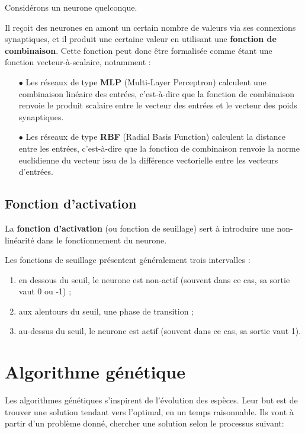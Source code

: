 Considérons un neurone quelconque.

Il reçoit des neurones en amont un certain nombre de valeurs via ses connexions synaptiques, et il produit une certaine valeur en utilisant une \textbf{fonction de combinaison}. Cette fonction peut donc être formalisée comme étant une fonction vecteur-à-scalaire, notamment :

\begin{itemize}
    \item[$\bullet$] Les réseaux de type \textbf{MLP} (Multi-Layer Perceptron) calculent une combinaison linéaire des entrées, c’est-à-dire que la fonction de combinaison renvoie le produit scalaire entre le vecteur des entrées et le vecteur des poids synaptiques.
    \item[$\bullet$] Les réseaux de type \textbf{RBF} (Radial Basis Function) calculent la distance entre les entrées, c’est-à-dire que la fonction de combinaison renvoie la norme euclidienne du vecteur issu de la différence vectorielle entre les vecteurs d’entrées.
\end{itemize}

\subsection{Fonction d’activation}
La \textbf{fonction d’activation} (ou fonction de seuillage) sert à introduire une non-linéarité dans le fonctionnement du neurone.


Les fonctions de seuillage présentent généralement trois intervalles :
\begin{enumerate}
    \item en dessous du seuil, le neurone est non-actif (souvent dans ce cas, sa sortie vaut 0 ou -1) ;
    \item aux alentours du seuil, une phase de transition ;
    \item au-dessus du seuil, le neurone est actif (souvent dans ce cas, sa sortie vaut 1).
\end{enumerate}



\section{Algorithme génétique}
Les algorithmes génétiques s'inspirent de l'évolution des espèces. Leur but est de trouver une solution tendant vers l'optimal, en un temps raisonnable. Ils vont à partir d'un problème donné, chercher une solution selon le processus suivant: 

